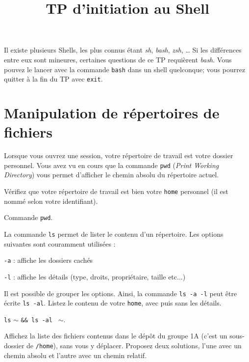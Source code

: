 \documentclass{scrartcl}
\title{TP d'initiation au Shell}
\begin{document}
\maketitle

Il existe plusieurs Shells, les plus connus étant \textit{sh}, \textit{bash}, \textit{zsh}, \ldots
Si les différences entre eux sont mineures, certaines questions de ce TP requièrent  \textit{bash}. Vous pouvez le lancer avec la commande \lstinline|bash| dans un shell quelconque; vous pourrez quitter à la fin du TP avec \lstinline|exit|.

\section{Manipulation de répertoires de fichiers}

Lorsque vous ouvrez une session, votre répertoire de travail est votre dossier personnel.
Vous avez vu en cours que la commande \lstinline|pwd| (\emph{Print Working Directory}) vous permet d’afficher le chemin absolu du répertoire actuel.

\begin{question}[name=Q.]
	Vérifiez que votre répertoire de travail est bien votre \lstinline|home| personnel (il est nommé selon votre identifiant).
\end{question}
\begin{solution}
	Commande \lstinline|pwd|.
\end{solution}

\begin{question}[name=Q.]
	La commande \lstinline|ls| permet de lister le contenu d’un répertoire. Les options suivantes sont couramment utilisées :
	\begin{description}
		\item \lstinline|-a| :
		affiche les dossiers cachés
		\item \lstinline|-l| :
		affiche les détails (type, droits, propriétaire, taille etc...)
	\end{description}
	Il est possible de grouper les options. Ainsi, la commande \lstinline|ls -a -l| peut être écrite \lstinline|ls -al|.
	Listez le contenu de votre \lstinline|home|, avec puis sans les détails.
\end{question}
\begin{solution}
	\lstinline|ls| $\sim$ \lstinline|&& ls -al | $\sim$.
\end{solution}

\begin{question}[name=Q.]
	Affichez la liste des fichiers contenus dans le dépôt du groupe 1A (c'est un sous-dossier de \lstinline|/home|), sans vous y déplacer. Proposez deux solutions, l'une avec un chemin absolu et l'autre avec un chemin relatif.
\end{question}
\begin{solution}
\end{solution}
\end{document}
